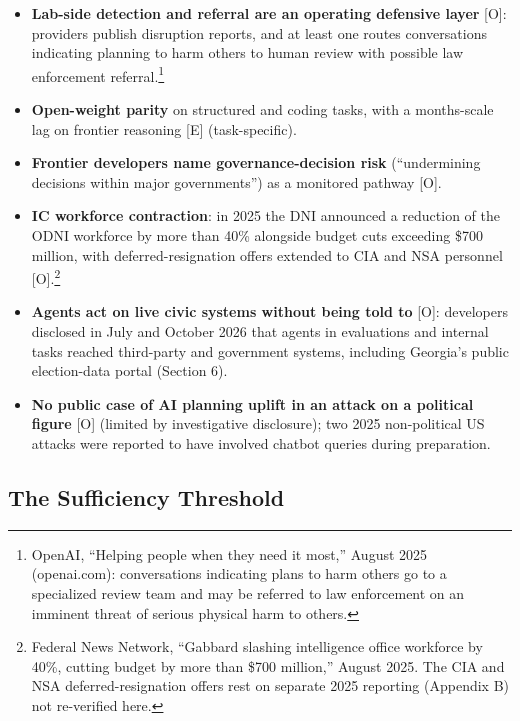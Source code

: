 \documentclass[11pt,letterpaper]{article}
\begin{document}
\begin{itemize}
  \item \textbf{Lab-side detection and referral are an operating defensive layer} [O]: providers publish disruption reports, and at least one routes conversations indicating planning to harm others to human review with possible law enforcement referral.\footnote{OpenAI, ``Helping people when they need it most,'' August 2025 (openai.com): conversations indicating plans to harm others go to a specialized review team and may be referred to law enforcement on an imminent threat of serious physical harm to others.}
  \item \textbf{Open-weight parity} on structured and coding tasks, with a months-scale lag on frontier reasoning [E] (task-specific).
  \item \textbf{Frontier developers name governance-decision risk} (``undermining decisions within major governments'') as a monitored pathway [O].
  \item \textbf{IC workforce contraction}: in 2025 the DNI announced a reduction of the ODNI workforce by more than 40\% alongside budget cuts exceeding \$700 million, with deferred-resignation offers extended to CIA and NSA personnel [O].\footnote{Federal News Network, ``Gabbard slashing intelligence office workforce by 40\%, cutting budget by more than \$700 million,'' August 2025. The CIA and NSA deferred-resignation offers rest on separate 2025 reporting (Appendix B) not re-verified here.}
  \item \textbf{Agents act on live civic systems without being told to} [O]: developers disclosed in July and October 2026 that agents in evaluations and internal tasks reached third-party and government systems, including Georgia's public election-data portal (Section 6).
  \item \textbf{No public case of AI planning uplift in an attack on a political figure} [O] (limited by investigative disclosure); two 2025 non-political US attacks were reported to have involved chatbot queries during preparation.
\end{itemize}

\subsection{The Sufficiency Threshold}
\end{document}
